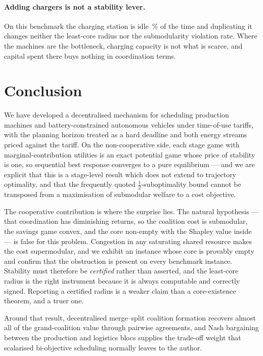 \documentclass[preprint, 3p, review, 12pt]{elsarticle}
\theoremstyle{definition}
\begin{document}
\paragraph{Adding chargers is not a stability lever.}
On this benchmark the charging station is idle \,\% of the
time and duplicating it changes neither the least-core radius nor the submodularity violation
rate. Where the machines are the bottleneck, charging capacity is not what is scarce, and
capital spent there buys nothing in coordination terms.

\section{Conclusion}
\label{sec:conc}

We have developed a decentralised mechanism for scheduling production machines and
battery-constrained autonomous vehicles under time-of-use tariffs, with the planning horizon
treated as a hard deadline and both energy streams priced against the tariff. On the
non-cooperative side, each stage game with marginal-contribution utilities is an exact
potential game whose price of stability is one, so sequential best response converges to a
pure equilibrium --- and we are explicit that this is a stage-level result which does not
extend to trajectory optimality, and that the frequently quoted $\tfrac12$-suboptimality
bound cannot be transposed from a maximisation of submodular welfare to a cost objective.

The cooperative contribution is where the surprise lies. The natural hypothesis --- that
coordination has diminishing returns, so the coalition cost is submodular, the savings game
convex, and the core non-empty with the Shapley value inside --- is false for this problem.
Congestion in any saturating shared resource makes the cost supermodular, and we exhibit an
instance whose core is provably empty and confirm that the obstruction is present on every
benchmark instance. Stability must therefore be \emph{certified} rather than asserted, and the
least-core radius is the right instrument because it is always computable and correctly
signed. Reporting a certified radius is a weaker claim than a core-existence theorem, and a
truer one.

Around that result, decentralised merge--split coalition formation recovers almost all of the
grand-coalition value through pairwise agreements, and Nash bargaining between the production
and logistics blocs supplies the trade-off weight that scalarised bi-objective scheduling
normally leaves to the author.
\end{document}
